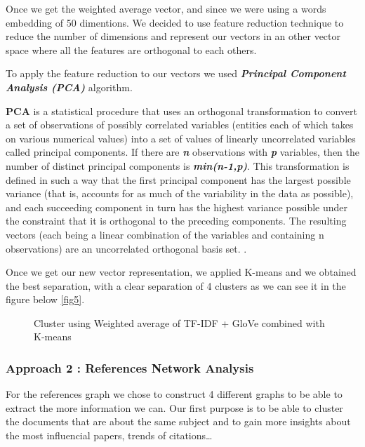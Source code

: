 \documentclass[article,twocolumn]{IEEEtran}
\begin{document}
Once we get the weighted average vector, and since we were using a words
embedding of 50 dimentions. We decided to use feature reduction
technique to reduce the number of dimensions and represent our vectors
in an other vector space where all the features are orthogonal to each
others.

To apply the feature reduction to our vectors we used
\textbf{\emph{Principal Component Analysis (PCA)}} algorithm.

\textbf{PCA} is a statistical procedure that uses an orthogonal
transformation to convert a set of observations of possibly correlated
variables (entities each of which takes on various numerical values)
into a set of values of linearly uncorrelated variables called principal
components. If there are \textbf{\emph{n}} observations with
\textbf{\emph{p}} variables, then the number of distinct principal
components is \textbf{\emph{min(n-1,p)}}. This transformation is defined
in such a way that the first principal component has the largest
possible variance (that is, accounts for as much of the variability in
the data as possible), and each succeeding component in turn has the
highest variance possible under the constraint that it is orthogonal to
the preceding components. The resulting vectors (each being a linear
combination of the variables and containing n observations) are an
uncorrelated orthogonal basis set. \cite{PCA}.

Once we get our new vector representation, we applied K-means and we
obtained the best separation, with a clear separation of 4 clusters as
we can see it in the figure below \ref{fig5}.


    \begin{figure}
        \begin{center}\end{center}
        \caption{Cluster using Weighted average of TF-IDF + GloVe  combined with K-means }
        \label{fig}
    \end{figure}
    
    \hypertarget{approach-2-references-network-analysis}{%
\subsubsection{Approach 2 : References Network
Analysis}\label{approach-2-references-network-analysis}}

For the references graph we chose to construct 4 different graphs to be
able to extract the more information we can. Our first purpose is to be
able to cluster the documents that are about the same subject and to
gain more insights about the most influencial papers, trends of
citations\ldots{}
\end{document}

